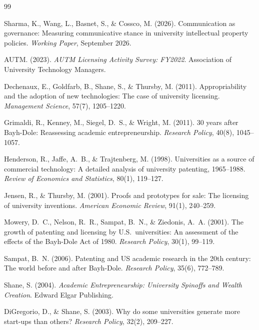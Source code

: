 \documentclass[12pt]{article}
\begin{document}

\begin{thebibliography}{99}

Sharma, K., Wang, L., Basnet, S., \& Cossco, M. (2026). Communication as governance:
Measuring communicative stance in university intellectual property policies.
\textit{Working Paper}, September 2026.

AUTM. (2023). \textit{AUTM Licensing Activity Survey: FY2022}. Association of
University Technology Managers.

Dechenaux, E., Goldfarb, B., Shane, S., \& Thursby, M. (2011). Appropriability and
the adoption of new technologies: The case of university licensing. \textit{Management
Science}, 57(7), 1205--1220.

Grimaldi, R., Kenney, M., Siegel, D.~S., \& Wright, M. (2011). 30 years after
Bayh-Dole: Reassessing academic entrepreneurship. \textit{Research Policy}, 40(8),
1045--1057.

Henderson, R., Jaffe, A.~B., \& Trajtenberg, M. (1998). Universities as a source of
commercial technology: A detailed analysis of university patenting, 1965--1988.
\textit{Review of Economics and Statistics}, 80(1), 119--127.

Jensen, R., \& Thursby, M. (2001). Proofs and prototypes for sale: The licensing of
university inventions. \textit{American Economic Review}, 91(1), 240--259.

Mowery, D.~C., Nelson, R.~R., Sampat, B.~N., \& Ziedonis, A.~A. (2001).
The growth of patenting and licensing by U.S.\ universities: An assessment of the
effects of the Bayh-Dole Act of 1980. \textit{Research Policy}, 30(1), 99--119.

Sampat, B.~N. (2006). Patenting and US academic research in the 20th century: The world
before and after Bayh-Dole. \textit{Research Policy}, 35(6), 772--789.

Shane, S. (2004). \textit{Academic Entrepreneurship: University Spinoffs and Wealth
Creation}. Edward Elgar Publishing.

DiGregorio, D., \& Shane, S. (2003). Why do some universities generate more start-ups
than others? \textit{Research Policy}, 32(2), 209--227.


\end{thebibliography}
\end{document}
